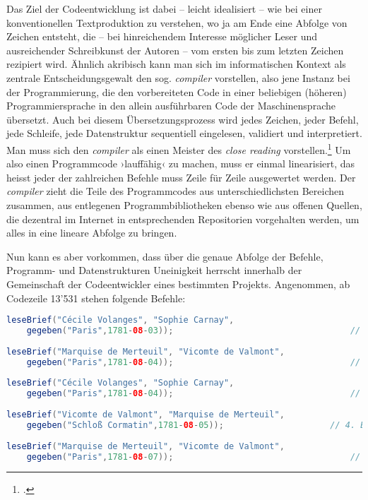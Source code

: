 \documentclass[a4paper,12pt]{article}
\newcommand{\inanf}[1]{›#1‹}
\begin{document}
Das Ziel der Codeentwicklung ist dabei – leicht idealisiert – wie bei einer konventionellen Textproduktion zu verstehen, wo ja am Ende eine Abfolge von Zeichen entsteht, die – bei hinreichendem Interesse möglicher Leser und ausreichender Schreibkunst der Autoren – vom ersten bis zum letzten Zeichen rezipiert wird. Ähnlich akribisch kann man sich im informatischen Kontext als zentrale Entscheidungsgewalt den sog. \emph{compiler} vorstellen, also jene Instanz bei der Programmierung, die den vorbereiteten Code in einer beliebigen (höheren) Programmiersprache in den allein ausführbaren Code der Maschinensprache übersetzt. Auch bei diesem Übersetzungsprozess wird jedes Zeichen, jeder Befehl, jede Schleife, jede Datenstruktur sequentiell eingelesen, validiert und interpretiert. Man muss sich den \emph{compiler} als einen Meister des \emph{close reading} vorstellen.\footcite[Hier wäre noch auf die kodifizierende Funktion, das Schliessen des Codes, hinzuweisen, die ja auch vom Compiler vorgenommen wird, vgl.][]{krajewski+vismann:2009} Um also einen Programmcode \inanf{lauffähig} zu machen, muss er einmal linearisiert, das heisst jeder der zahlreichen Befehle muss Zeile für Zeile ausgewertet werden. Der \emph{compiler} zieht die Teile des Programmcodes aus unterschiedlichsten Bereichen zusammen, aus entlegenen Programmbibliotheken ebenso wie aus offenen Quellen, die dezentral im Internet in entsprechenden Repositorien vorgehalten werden, um alles in eine lineare Abfolge zu bringen. 

Nun kann es aber vorkommen, dass über die genaue Abfolge der Befehle, Programm- und Datenstrukturen Uneinigkeit herrscht innerhalb der Gemeinschaft der Codeentwickler eines bestimmten Projekts. Angenommen, ab Codezeile 13'531 stehen folgende Befehle:

\begin{lstlisting}[language=Java, firstnumber=13531]
leseBrief("Cécile Volanges", "Sophie Carnay", 
	gegeben("Paris",1781-08-03));                           		// 1. Brief
	
leseBrief("Marquise de Merteuil", "Vicomte de Valmont", 
	gegeben("Paris",1781-08-04));                           		// 2. Brief
	
leseBrief("Cécile Volanges", "Sophie Carnay", 
	gegeben("Paris",1781-08-04));                           		// 3. Brief
	
leseBrief("Vicomte de Valmont", "Marquise de Merteuil", 
	gegeben("Schloß Cormatin",1781-08-05));                 	// 4. Brief
	
leseBrief("Marquise de Merteuil", "Vicomte de Valmont", 
	gegeben("Paris",1781-08-07));                           		// 5. Brief
\end{lstlisting}
\end{document}
